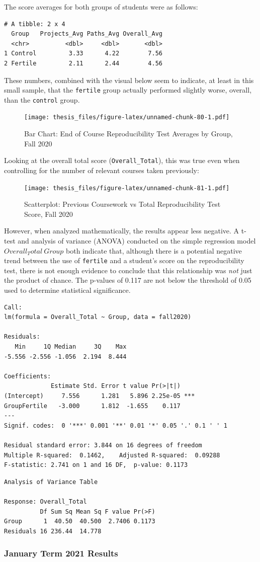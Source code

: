 \documentclass[12pt,twoside]{reedthesis}
\begin{document}
The score averages for both groups of students were as follows:
\begin{verbatim}
# A tibble: 2 x 4
  Group   Projects_Avg Paths_Avg Overall_Avg
  <chr>          <dbl>     <dbl>       <dbl>
1 Control         3.33      4.22        7.56
2 Fertile         2.11      2.44        4.56
\end{verbatim}
These numbers, combined with the visual below seem to indicate, at least in this small sample, that the \texttt{fertile} group actually performed slightly worse, overall, than the \texttt{control} group.
\begin{figure}
\centering
\texttt{[image: thesis\_files/figure-latex/unnamed-chunk-80-1.pdf]}
\caption{\label{fig:unnamed-chunk-80}Bar Chart: End of Course Reproducibility Test Averages by Group, Fall 2020}
\end{figure}
Looking at the overall total score (\texttt{Overall\_Total}), this was true even when controlling for the number of relevant courses taken previously:
\begin{figure}
\centering
\texttt{[image: thesis\_files/figure-latex/unnamed-chunk-81-1.pdf]}
\caption{\label{fig:unnamed-chunk-81}Scatterplot: Previous Coursework vs Total Reproducibility Test Score, Fall 2020}
\end{figure}
However, when analyzed mathematically, the results appear less negative. A t-test and analysis of variance (ANOVA) conducted on the simple regression model \(Overall_Total ~ Group\) both indicate that, although there is a potential negative trend between the use of \texttt{fertile} and a student's score on the reproducibility test, there is not enough evidence to conclude that this relationship was \emph{not} just the product of chance. The p-values of 0.117 are not below the threshold of 0.05 used to determine statistical significance.
\begin{verbatim}
Call:
lm(formula = Overall_Total ~ Group, data = fall2020)

Residuals:
   Min     1Q Median     3Q    Max 
-5.556 -2.556 -1.056  2.194  8.444 

Coefficients:
             Estimate Std. Error t value Pr(>|t|)    
(Intercept)     7.556      1.281   5.896 2.25e-05 ***
GroupFertile   -3.000      1.812  -1.655    0.117    
---
Signif. codes:  0 '***' 0.001 '**' 0.01 '*' 0.05 '.' 0.1 ' ' 1

Residual standard error: 3.844 on 16 degrees of freedom
Multiple R-squared:  0.1462,    Adjusted R-squared:  0.09288 
F-statistic: 2.741 on 1 and 16 DF,  p-value: 0.1173
\end{verbatim}
\begin{verbatim}
Analysis of Variance Table

Response: Overall_Total
          Df Sum Sq Mean Sq F value Pr(>F)
Group      1  40.50  40.500  2.7406 0.1173
Residuals 16 236.44  14.778               
\end{verbatim}
\hypertarget{january-term-2021-results}{%
\subsubsection{January Term 2021 Results}\label{january-term-2021-results}}
\end{document}
